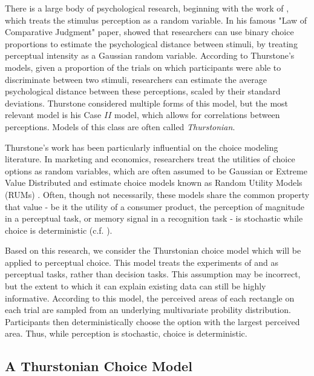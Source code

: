 There is a large body of psychological research, beginning with the work of \textcite{thurstone1927law}, which treats the stimulus perception as a random variable. In his famous "Law of Comparative Judgment" paper, \textcite{thurstone1927law} showed that researchers can use binary choice proportions to estimate the psychological distance between stimuli, by treating perceptual intensity as a Gaussian random variable. According to Thurstone's models, given a proportion of the trials on which participants were able to discriminate between two stimuli, researchers can estimate the average psychological distance between these perceptions, scaled by their standard deviations. Thurstone considered multiple forms of this model, but the most relevant model is his Case $II$ model, which allows for correlations between perceptions. Models of this class are often called \textit{Thurstonian}.

Thurstone's work has been particularly influential on the choice modeling literature. In marketing and economics, researchers treat the utilities of choice options as random variables, which are often assumed to be Gaussian or Extreme Value Distributed and estimate choice models known as Random Utility Models (RUMs) \parencite{mcfadden2001economic,hausman1978conditional,train2009discrete}. Often, though not necessarily, these models share the common property that value - be it the utility of a consumer product, the perception of magnitude in a perceptual task, or memory signal in a recognition task - is stochastic while choice is deterministic  (c.f. \textcite{benjamin2009signal}).

Based on this research, we consider the Thurstonian choice model which will be applied to perceptual choice. This model treats the experiments of \textcite{trueblood2013not} and \textcite{spektorWhenGoodLooks2018b} as perceptual tasks, rather than decision tasks. This assumption may be incorrect, but the extent to which it can explain existing data can still be highly informative. According to this model, the perceived areas of each rectangle on each trial are sampled from an underlying multivariate probility distribution. Participants then deterministically choose the option with the largest perceived area. Thus, while perception is stochastic, choice is deterministic.

\subsection{A Thurstonian Choice Model}

